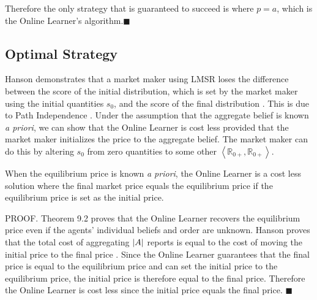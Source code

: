 Therefore the only strategy that is guaranteed to succeed is where $p=a$, which is the Online Learner's algorithm.$\blacksquare$\\

\subsection{Optimal Strategy}
Hanson demonstrates that a market maker using LMSR loses the difference between the score of the initial distribution, which is set by the market maker using the initial quantities $s_0$, and the score of the final distribution \cite{Hanson2003}. This is due to Path Independence \cite{Othman:2013:PLA:2509413.2509414}. Under the assumption that the aggregate belief is known \emph{a priori}, we can show that the Online Learner is cost less provided that the market maker initializes the price to the aggregate belief. The market maker can do this by altering $s_0$ from zero quantities to some other $\left<\mathbb{R}_{0+}, \mathbb{R}_{0+}\right>$. \\

\begin{theorem}
When the equilibrium price is known \emph{a priori}, the Online Learner is a cost less solution where the final market price equals the equilibrium price if the equilibrium price is set as the initial price.
\end{theorem}

PROOF. Theorem 9.2 proves that the Online Learner recovers the equilibrium price even if the agents' individual beliefs and order are unknown. Hanson proves that the total cost of aggregating $|A|$ reports is equal to the cost of moving the initial price to the final price \cite{Hanson2003}. Since the Online Learner guarantees that the final price is equal to the equilibrium price and can set the initial price to the equilibrium price, the initial price is therefore equal to the final price. Therefore the Online Learner is cost less since the initial price equals the final price. $\blacksquare$\\ 